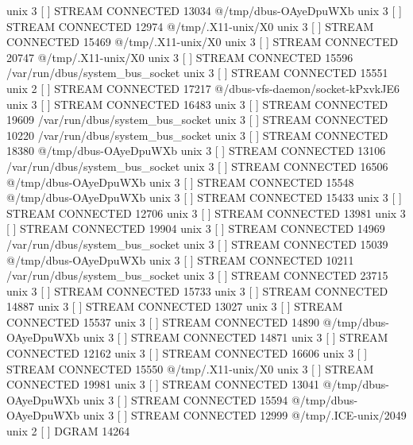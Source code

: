 unix  3      [ ]         STREAM     CONNECTED     13034    @/tmp/dbus-OAyeDpuWXb
unix  3      [ ]         STREAM     CONNECTED     12974    @/tmp/.X11-unix/X0
unix  3      [ ]         STREAM     CONNECTED     15469    @/tmp/.X11-unix/X0
unix  3      [ ]         STREAM     CONNECTED     20747    @/tmp/.X11-unix/X0
unix  3      [ ]         STREAM     CONNECTED     15596    /var/run/dbus/system_bus_socket
unix  3      [ ]         STREAM     CONNECTED     15551    
unix  2      [ ]         STREAM     CONNECTED     17217    @/dbus-vfs-daemon/socket-kPxvkJE6
unix  3      [ ]         STREAM     CONNECTED     16483    
unix  3      [ ]         STREAM     CONNECTED     19609    /var/run/dbus/system_bus_socket
unix  3      [ ]         STREAM     CONNECTED     10220    /var/run/dbus/system_bus_socket
unix  3      [ ]         STREAM     CONNECTED     18380    @/tmp/dbus-OAyeDpuWXb
unix  3      [ ]         STREAM     CONNECTED     13106    /var/run/dbus/system_bus_socket
unix  3      [ ]         STREAM     CONNECTED     16506    @/tmp/dbus-OAyeDpuWXb
unix  3      [ ]         STREAM     CONNECTED     15548    @/tmp/dbus-OAyeDpuWXb
unix  3      [ ]         STREAM     CONNECTED     15433    
unix  3      [ ]         STREAM     CONNECTED     12706    
unix  3      [ ]         STREAM     CONNECTED     13981    
unix  3      [ ]         STREAM     CONNECTED     19904    
unix  3      [ ]         STREAM     CONNECTED     14969    /var/run/dbus/system_bus_socket
unix  3      [ ]         STREAM     CONNECTED     15039    @/tmp/dbus-OAyeDpuWXb
unix  3      [ ]         STREAM     CONNECTED     10211    /var/run/dbus/system_bus_socket
unix  3      [ ]         STREAM     CONNECTED     23715    
unix  3      [ ]         STREAM     CONNECTED     15733    
unix  3      [ ]         STREAM     CONNECTED     14887    
unix  3      [ ]         STREAM     CONNECTED     13027    
unix  3      [ ]         STREAM     CONNECTED     15537    
unix  3      [ ]         STREAM     CONNECTED     14890    @/tmp/dbus-OAyeDpuWXb
unix  3      [ ]         STREAM     CONNECTED     14871    
unix  3      [ ]         STREAM     CONNECTED     12162    
unix  3      [ ]         STREAM     CONNECTED     16606    
unix  3      [ ]         STREAM     CONNECTED     15550    @/tmp/.X11-unix/X0
unix  3      [ ]         STREAM     CONNECTED     19981    
unix  3      [ ]         STREAM     CONNECTED     13041    @/tmp/dbus-OAyeDpuWXb
unix  3      [ ]         STREAM     CONNECTED     15594    @/tmp/dbus-OAyeDpuWXb
unix  3      [ ]         STREAM     CONNECTED     12999    @/tmp/.ICE-unix/2049
unix  2      [ ]         DGRAM                    14264    
